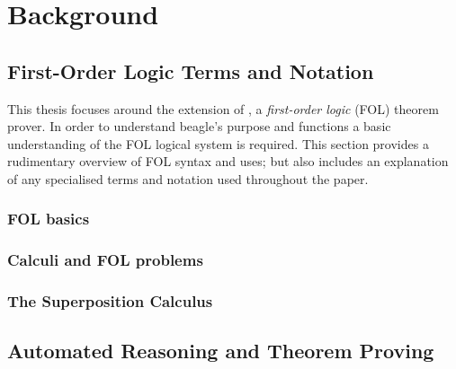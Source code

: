 
\chapter{Background}
\label{cha:background}

\section{First-Order Logic Terms and Notation}
\label{sec:senfol}

This thesis focuses around the extension of \beagle, a \emph{first-order logic} (FOL) theorem prover.
In order to understand beagle's purpose and functions a basic understanding of the FOL logical system
is required. This section provides a rudimentary overview of FOL syntax and uses;
but also includes an explanation of any specialised terms and notation used throughout the paper.

\subsection{FOL basics}

\subsection{Calculi and FOL problems}

\subsection{The Superposition Calculus}


\section{Automated Reasoning and Theorem Proving}
\label{sec:proving}

